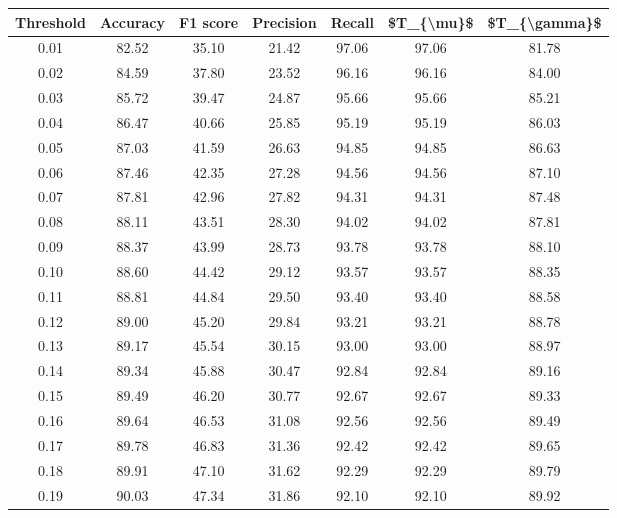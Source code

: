 \begin{tabular}{|c|c|c|c|c|c|c|}
\hline
 Threshold &  Accuracy &  F1 score &  Precision &  Recall &  \$T\_\{\textbackslash mu\}\$ &  \$T\_\{\textbackslash gamma\}\$ \\
\hline
      0.01 &     82.52 &     35.10 &      21.42 &   97.06 &      97.06 &         81.78 \\
      0.02 &     84.59 &     37.80 &      23.52 &   96.16 &      96.16 &         84.00 \\
      0.03 &     85.72 &     39.47 &      24.87 &   95.66 &      95.66 &         85.21 \\
      0.04 &     86.47 &     40.66 &      25.85 &   95.19 &      95.19 &         86.03 \\
      0.05 &     87.03 &     41.59 &      26.63 &   94.85 &      94.85 &         86.63 \\
      0.06 &     87.46 &     42.35 &      27.28 &   94.56 &      94.56 &         87.10 \\
      0.07 &     87.81 &     42.96 &      27.82 &   94.31 &      94.31 &         87.48 \\
      0.08 &     88.11 &     43.51 &      28.30 &   94.02 &      94.02 &         87.81 \\
      0.09 &     88.37 &     43.99 &      28.73 &   93.78 &      93.78 &         88.10 \\
      0.10 &     88.60 &     44.42 &      29.12 &   93.57 &      93.57 &         88.35 \\
      0.11 &     88.81 &     44.84 &      29.50 &   93.40 &      93.40 &         88.58 \\
      0.12 &     89.00 &     45.20 &      29.84 &   93.21 &      93.21 &         88.78 \\
      0.13 &     89.17 &     45.54 &      30.15 &   93.00 &      93.00 &         88.97 \\
      0.14 &     89.34 &     45.88 &      30.47 &   92.84 &      92.84 &         89.16 \\
      0.15 &     89.49 &     46.20 &      30.77 &   92.67 &      92.67 &         89.33 \\
      0.16 &     89.64 &     46.53 &      31.08 &   92.56 &      92.56 &         89.49 \\
      0.17 &     89.78 &     46.83 &      31.36 &   92.42 &      92.42 &         89.65 \\
      0.18 &     89.91 &     47.10 &      31.62 &   92.29 &      92.29 &         89.79 \\
      0.19 &     90.03 &     47.34 &      31.86 &   92.10 &      92.10 &         89.92 \\

\end{tabular}
